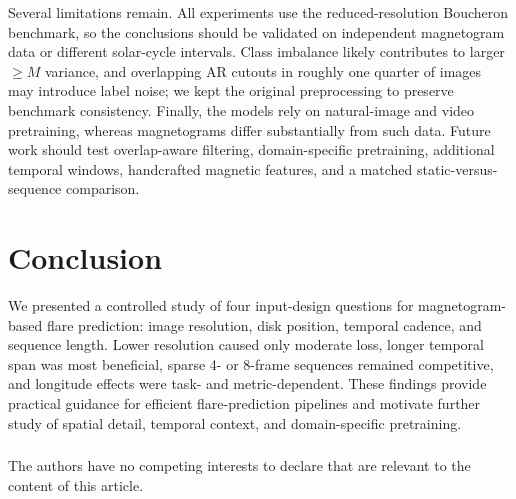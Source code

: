 \documentclass[runningheads]{llncs}
\begin{document}

Several limitations remain. All experiments use the reduced-resolution Boucheron benchmark, so the conclusions should be validated on independent magnetogram data or different solar-cycle intervals. Class imbalance likely contributes to larger $\geq M$ variance, and overlapping AR cutouts in roughly one quarter of images~\cite{ref_boucheron} may introduce label noise; we kept the original preprocessing to preserve benchmark consistency. Finally, the models rely on natural-image and video pretraining, whereas magnetograms differ substantially from such data. Future work should test overlap-aware filtering, domain-specific pretraining, additional temporal windows, handcrafted magnetic features, and a matched static-versus-sequence comparison.

\section{Conclusion}

We presented a controlled study of four input-design questions for magnetogram-based flare prediction: image resolution, disk position, temporal cadence, and sequence length. Lower resolution caused only moderate loss, longer temporal span was most beneficial, sparse 4- or 8-frame sequences remained competitive, and longitude effects were task- and metric-dependent. These findings provide practical guidance for efficient flare-prediction pipelines and motivate further study of spatial detail, temporal context, and domain-specific pretraining.

\begin{credits}
\subsubsection{\discintname}
The authors have no competing interests to declare that are relevant to the content of this article.
\end{credits}
\end{document}
